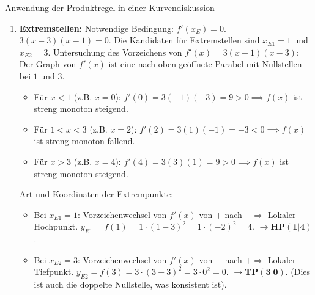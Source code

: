\begin{loesungsumgebung}{Anwendung der Produktregel in einer Kurvendiskussion}
\begin{enumerate}[label=(\alph*)]
    \item \textbf{Extremstellen:}
    Notwendige Bedingung: $f'(x_E)=0$.
    $3(x-3)(x-1) = 0$.
    Die Kandidaten für Extremstellen sind $x_{E1} = 1$ und $x_{E2} = 3$.
    Untersuchung des Vorzeichens von $f'(x) = 3(x-1)(x-3)$:
    Der Graph von $f'(x)$ ist eine nach oben geöffnete Parabel mit Nullstellen bei $1$ und $3$.
    \begin{itemize}
        \item Für $x < 1$ (z.B. $x=0$): $f'(0) = 3(-1)(-3) = 9 > 0 \implies f(x)$ ist streng monoton steigend.
        \item Für $1 < x < 3$ (z.B. $x=2$): $f'(2) = 3(1)(-1) = -3 < 0 \implies f(x)$ ist streng monoton fallend.
        \item Für $x > 3$ (z.B. $x=4$): $f'(4) = 3(3)(1) = 9 > 0 \implies f(x)$ ist streng monoton steigend.
    \end{itemize}
    Art und Koordinaten der Extrempunkte:
    \begin{itemize}
        \item Bei $x_{E1} = 1$: Vorzeichenwechsel von $f'(x)$ von $+$ nach $- \Rightarrow$ Lokaler Hochpunkt.
        $y_{E1} = f(1) = 1 \cdot (1-3)^2 = 1 \cdot (-2)^2 = 4$.
        $\rightarrow \mathbf{HP(1|4)}$.
        \item Bei $x_{E2} = 3$: Vorzeichenwechsel von $f'(x)$ von $-$ nach $+ \Rightarrow$ Lokaler Tiefpunkt.
        $y_{E2} = f(3) = 3 \cdot (3-3)^2 = 3 \cdot 0^2 = 0$.
        $\rightarrow \mathbf{TP(3|0)}$. (Dies ist auch die doppelte Nullstelle, was konsistent ist).
    \end{itemize}


\end{enumerate}
\end{loesungsumgebung}
